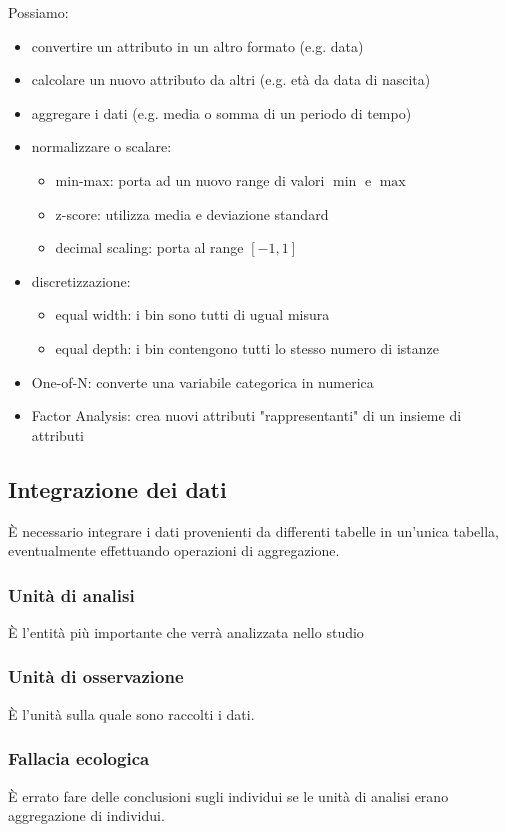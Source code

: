 \documentclass[11pt,onecolumn,a4paper,oneside]{book}
\begin{document}
Possiamo:
\begin{itemize}
\item convertire un attributo in un altro formato (e.g. data)
\item calcolare un nuovo attributo da altri (e.g. età da data di nascita)
\item aggregare i dati (e.g. media o somma di un periodo di tempo)
\item normalizzare o scalare:
\begin{itemize}
\item min-max: porta ad un nuovo range di valori $\min$ e $\max$
\item z-score: utilizza media e deviazione standard
\item decimal scaling: porta al range $[-1,1]$
\end{itemize}
\item discretizzazione:
\begin{itemize}
\item equal width: i bin sono tutti di ugual misura
\item equal depth: i bin contengono tutti lo stesso numero di istanze
\end{itemize}
\item One-of-N: converte una variabile categorica in numerica
\item Factor Analysis: crea nuovi attributi "rappresentanti" di un insieme di attributi
\end{itemize}


\subsection{Integrazione dei dati}
È necessario integrare i dati provenienti da differenti tabelle in un'unica tabella, eventualmente effettuando operazioni di aggregazione.

\subsubsection{Unità di analisi}
È l'entità più importante che verrà analizzata nello studio

\subsubsection{Unità di osservazione}
È l'unità sulla quale sono raccolti i dati.

\subsubsection{Fallacia ecologica}
È errato fare delle conclusioni sugli individui se le unità di analisi erano aggregazione di individui.
\end{document}
